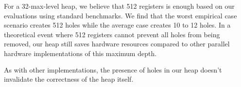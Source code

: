 For a 32-max-level heap, we believe that 512 registers is enough based on our evaluations using standard benchmarks.
We find that the worst empirical case scenario creates 512 holes while the average case creates 10 to 12 holes.
In a theoretical event where 512 registers cannot prevent all holes from being removed, our heap still saves hardware resources compared to other parallel hardware implementations of this maximum depth. 

As with other implementations, the presence of holes in our heap doesn't invalidate the correctness of the heap itself.

